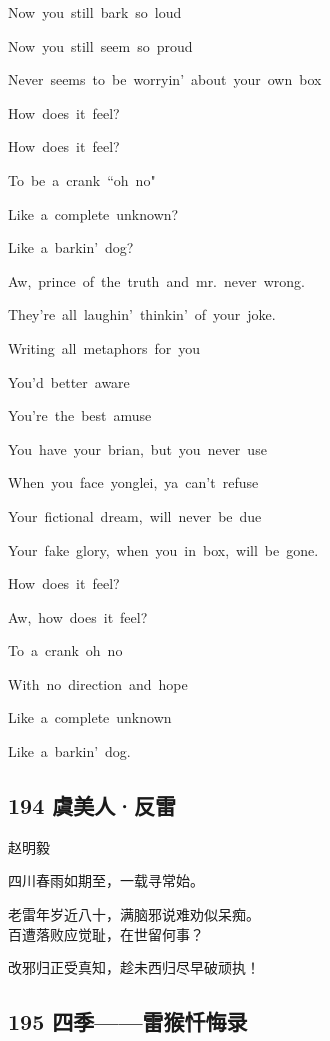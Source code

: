 Now~you~still~bark~so~loud

Now~you~still~seem~so~proud

Never~seems~to~be~worryin'~about~your~own~box

How~does~it~feel?

How~does~it~feel?

To~be~a~crank~``oh~no"

Like~a~complete~unknown?

Like~a~barkin'~dog?

Aw,~prince~of~the~truth~and~mr.~never~wrong.

They're~all~laughin'~thinkin'~of~your~joke.

Writing~all~metaphors~for~you

You'd~better~aware

You're~the~best~amuse

You~have~your~brian,~but~you~never~use

When~you~face~yonglei,~ya~can't~refuse

Your~fictional~dream,~will~never~be~due

Your~fake~glory,~when~you~in~box,~will~be~gone.

How~does~it~feel?

Aw,~how~does~it~feel?

To~a~crank~oh~no

With~no~direction~and~hope

Like~a~complete~unknown

Like~a~barkin'~dog. ~\\

\hypertarget{ux865eux7f8eux4ebaux53cdux96f7}{%
\subsection{194 虞美人·反雷}\label{ux865eux7f8eux4ebaux53cdux96f7}}

赵明毅

四川春雨如期至，一载寻常始。

老雷年岁近八十，满脑邪说难劝似呆痴。 ~\\
百遭落败应觉耻，在世留何事？

改邪归正受真知，趁未西归尽早破顽执！

\hypertarget{ux56dbux5b63ux96f7ux7334ux5fcfux6094ux5f55}{%
\subsection{195
四季------雷猴忏悔录}\label{ux56dbux5b63ux96f7ux7334ux5fcfux6094ux5f55}}

